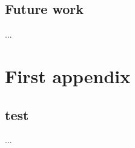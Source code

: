 \section{Future work}\label{c.conclusion.future}
...

% 
% 
% 
% 
% 



\appendix
\chapter{First appendix}

\section{test}
...


